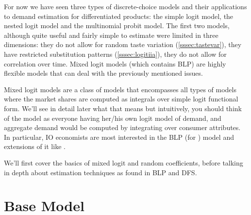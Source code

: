 For now we have seen three types of discrete-choice models and their applications to demand estimation for differentiated products: the simple logit model, the nested logit model and the multinomial probit model. The first two models, although quite useful and fairly simple to estimate were limited in three dimensions: they do not allow for random taste variation (\ref{sssec:tastevar}), they have restricted substitution patterns (\ref{sssec:logitiia}),  they do not allow for correlation over time. Mixed logit models (which contains BLP) are highly flexible models that can deal with the previously mentioned issues.

Mixed logit models are a class of models that encompasses all types of models where the market shares are computed as integrals over simple logit functional form. We'll see in detail later what that means but intuitively, you should think of the model as everyone having her/his own logit model of demand, and aggregate demand would be computed by integrating over consumer attributes. In particular, IO economists are most interested in the BLP (for \cite{blp_95}) model and extensions of it like \cite{dfs_12}.

We'll first cover the basics of mixed logit and random coefficients, before talking in depth about estimation techniques as found in BLP and DFS.

\section{Base Model}

